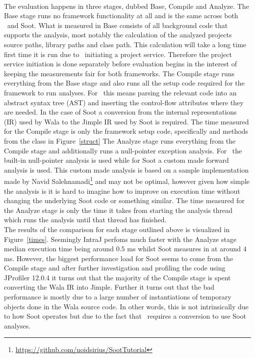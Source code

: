 \documentclass[sigplan,10pt]{acmart}
\begin{document}
\\
The evaluation happens in three stages, dubbed Base, Compile and Analyze. The Base stage runs no framework functionality at all and is the same across both \intraj\ and Soot. What is measured in Base consists of all background code that supports the analysis, most notably the calculation of the analyzed projects source paths, library paths and class path. This calculation will take a long time first time it is run due to \magpie\ initiating a project service. Therefore the project service initiation is done separately before evaluation begins in the interest of keeping the measurements fair for both frameworks. The Compile stage runs everything from the Base stage and also runs all the setup code required for the framework to run analyses. For \intraj\ this means parsing the relevant code into an abstract syntax tree (AST) and inserting the control-flow attributes where they are needed. In the case of Soot a conversion from the internal representations (IR) used by Wala to the Jimple IR used by Soot is required. The time measured for the Compile stage is only the framework setup code, specifically  and  methods from the  class in Figure~\ref{struct} The Analyze stage runs everything from the Compile stage and additionally runs a null-pointer exception analysis. For \intraj\ the built-in null-pointer analysis is used while for Soot a custom made forward analysis is used. This custom made analysis is based on a sample implementation made by Navid Salehnamadi\footnote{\url{https://github.com/noidsirius/SootTutorial}} and may not be optimal, however given how simple the analysis is it is hard to imagine how to improve on execution time without changing the underlying Soot code or something similar. The time measured for the Analyze stage is only the time it takes from starting the analysis thread which runs the analysis until that thread has finished.
\\
The results of the comparison for each stage outlined above is visualized in Figure~\ref{times}. Seemingly IntraJ perfoms much faster with the Analyze stage median execution time being around $0.5$ ms whilst Soot measures in at around $4$ ms. However, the biggest performance load for Soot seems to come from the Compile stage and after further investigation and profiling the code using JProfiler 12.0.4 it turns out that the majority of the Compile stage is spent converting the Wala IR into Jimple. Further it turns out that the bad performance is mostly due to a large number of instantiations of temporary objects done in the Wala source code. In other words, this is not intrinsically due to how Soot operates but due to the fact that \magpie\ requires a conversion to use Soot analyses.
\end{document}
